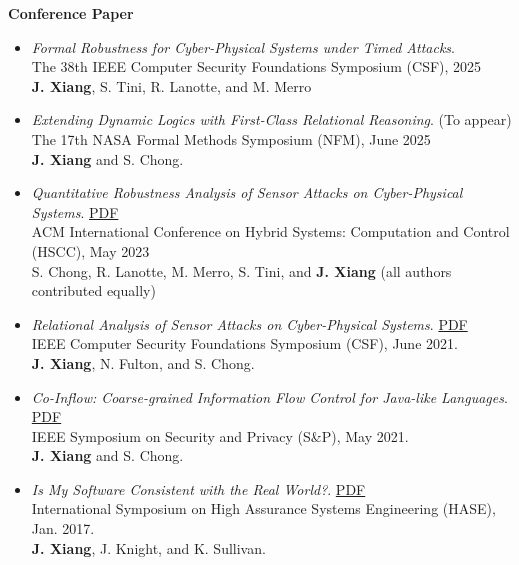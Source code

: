 \documentclass[11pt]{article}
\begin{document}
\textbf{Conference Paper}

\begin{itemize}
  \item \textit{Formal Robustness for Cyber-Physical Systems under Timed Attacks}. \\
  The 38th IEEE Computer Security Foundations Symposium (CSF), 2025 \\
  \textbf{J. Xiang}, S. Tini, R. Lanotte, and M. Merro

  \item \textit{Extending Dynamic Logics with First-Class Relational Reasoning}. (To appear) \\
  The 17th NASA Formal Methods Symposium (NFM), June 2025 \\
  \textbf{J. Xiang} and S. Chong. 

  \item \textit{Quantitative Robustness Analysis of Sensor Attacks on Cyber-Physical Systems}.
  \href{https://www.jianxiang.info/pub/HSCC23.pdf}{PDF} \\
  ACM International Conference on Hybrid Systems: Computation and Control (HSCC), May 2023 \\
  S. Chong, R. Lanotte, M. Merro, S. Tini, and \textbf{J. Xiang}
  (all authors contributed equally)

  \item \textit{Relational Analysis of Sensor Attacks on Cyber-Physical Systems}.  \href{https://www.jianxiang.info/pub/CSF21.pdf}{PDF} \\
  IEEE Computer Security Foundations Symposium (CSF),  June 2021. \\
  \textbf{J. Xiang}, N. Fulton, and S. Chong. 
  
\item \textit{Co-Inflow: Coarse-grained Information Flow Control for Java-like Languages}. \href{https://www.jianxiang.info/pub/SP21.pdf}{PDF} \\
  IEEE Symposium on Security and Privacy (S\&P), May 2021.  \\
  \textbf{J. Xiang} and S. Chong.
  
\item \textit{Is My Software Consistent with the Real World?}. \href{https://www.jianxiang.info/pub/HASE17.pdf}{PDF} \\
  International Symposium on High Assurance Systems Engineering (HASE), Jan. 2017.  \\
  \textbf{J. Xiang}, J. Knight, and K. Sullivan.


\end{itemize}
\end{document}
